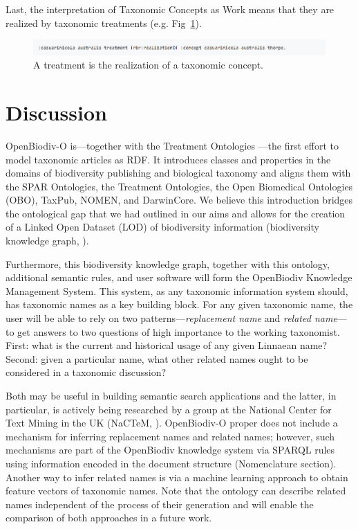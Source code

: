 Last, the interpretation of Taxonomic Concepts as Work means that they are realized by taxonomic treatments (e.g. Fig~\ref{example-treatment-concept}).

\begin{figure}[h!]
\centering
  \includegraphics[width=\textwidth]{Figures/example-treatment-concept}
  \decoRule
  \caption[Example connection between a treatment and a taxonomic concept.]{A treatment is the realization of a taxonomic concept.}
  \label{example-treatment-concept}
\end{figure}

\section{Discussion}

OpenBiodiv-O is---together with the Treatment Ontologies \cite{catapano_treatment_2016}---the first effort to model taxonomic articles as RDF. It introduces classes and properties in the domains of biodiversity publishing and biological taxonomy and aligns them with the SPAR Ontologies, the Treatment Ontologies, the Open Biomedical Ontologies (OBO), TaxPub, NOMEN, and DarwinCore. We believe this introduction bridges the ontological gap that we had outlined in our aims and allows for the creation of a Linked Open Dataset (LOD) of biodiversity information (biodiversity knowledge graph, \cite{senderov_open_2016, page_towards_2016}).

Furthermore, this biodiversity knowledge graph, together with this ontology, additional semantic rules, and user software will form the OpenBiodiv Knowledge Management System. This system, as any taxonomic information system should, has taxonomic names as a key building block. For any given taxonomic name, the user will be able to rely on two patterns---\emph{replacement name} and \emph{related name}---to get answers to two questions of high importance to the working taxonomist. First: what is the current and historical usage of any given Linnaean name? Second: given a particular name, what other related names ought to be considered in a taxonomic discussion?

Both may be useful in building semantic search applications and the latter, in particular, is actively being researched by a group at the National Center for Text Mining in the UK (NaCTeM, \cite{nguyen_constructing_2017}). \mbox{OpenBiodiv-O} proper does not include a mechanism for inferring replacement names and related names; however, such mechanisms are part of the OpenBiodiv knowledge system via SPARQL rules using information encoded in the document structure (Nomenclature section). Another way to infer related names is via a machine learning approach to obtain feature vectors of taxonomic names.  Note that the ontology can describe related names independent of the process of their generation and will enable the comparison of both approaches in a future work.

